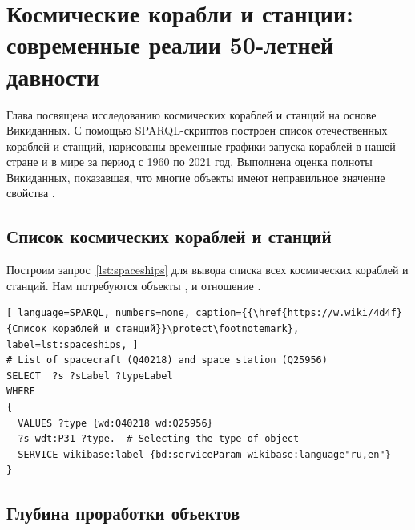 
\chapter{Космические корабли и станции: современные реалии 50-летней давности}
\label{ch:spacecraft-space-station}

Глава посвящена исследованию космических кораблей и станций на основе Викиданных. 
С помощью SPARQL-скриптов построен список отечественных кораблей и станций, 
нарисованы временные графики запуска кораблей в нашей стране и в мире за период с 1960 по 2021 год. 
Выполнена оценка полноты Викиданных, показавшая, 
что многие объекты имеют неправильное значение свойства 
.


\section{Список космических кораблей и станций}

Построим запрос~\ref{lst:spaceships} для вывода списка всех космических кораблей и станций. 
Нам потребуются объекты , 
 и отношение . 

\begin{lstlisting}[ language=SPARQL, numbers=none, caption={{\href{https://w.wiki/4d4f}{Список кораблей и станций}}\protect\footnotemark}, label=lst:spaceships, ]
# List of spacecraft (Q40218) and space station (Q25956)
SELECT  ?s ?sLabel ?typeLabel
WHERE
{
  VALUES ?type {wd:Q40218 wd:Q25956}
  ?s wdt:P31 ?type.  # Selecting the type of object
  SERVICE wikibase:label {bd:serviceParam wikibase:language"ru,en"}
}
\end{lstlisting}


\section{Глубина проработки объектов}

